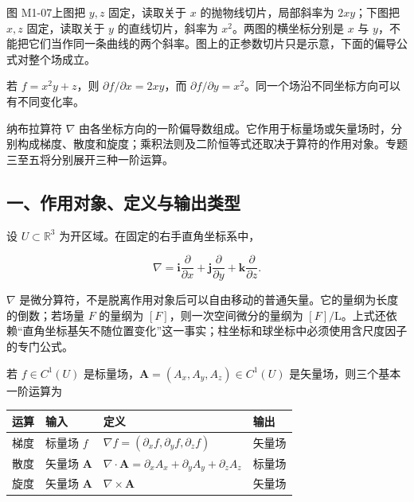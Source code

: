 图 M1-07上图把 \(y,z\) 固定，读取关于 \(x\) 的抛物线切片，局部斜率为
\(2xy\)；下图把 \(x,z\) 固定，读取关于 \(y\) 的直线切片，斜率为
\(x^2\)。两图的横坐标分别是 \(x\) 与
\(y\)，不能把它们当作同一条曲线的两个斜率。图上的正参数切片只是示意，下面的偏导公式对整个场成立。

若 \(f=x^2y+z\)，则 \(\partial f/\partial x=2xy\)，而
\(\partial f/\partial y=x^2\)。同一个场沿不同坐标方向可以有不同变化率。

纳布拉算符 \(\nabla\)
由各坐标方向的一阶偏导数组成。它作用于标量场或矢量场时，分别构成梯度、散度和旋度；乘积法则及二阶恒等式还取决于算符的作用对象。专题三至五将分别展开三种一阶运算。

\subsection{一、作用对象、定义与输出类型}\label{m1:ux4e00ux4f5cux7528ux5bf9ux8c61ux5b9aux4e49ux4e0eux8f93ux51faux7c7bux578b}

设 \(U\subset\mathbb R^3\) 为开区域。在固定的右手直角坐标系中，

\[
\boxed{\nabla
=\mathbf i\frac{\partial}{\partial x}
+\mathbf j\frac{\partial}{\partial y}
+\mathbf k\frac{\partial}{\partial z}}.
\]

\(\nabla\)
是微分算符，不是脱离作用对象后可以自由移动的普通矢量。它的量纲为长度的倒数；若场量
\(F\) 的量纲为 \([F]\)，则一次空间微分的量纲为
\([F]/\mathrm L\)。上式还依赖``直角坐标基矢不随位置变化''这一事实；柱坐标和球坐标中必须使用含尺度因子的专门公式。

若 \(f\in C^1(U)\) 是标量场，\(\mathbf A=(A_x,A_y,A_z)\in C^1(U)\)
是矢量场，则三个基本一阶运算为

{\def\LTcaptype{none} %
\begin{longtable}[]{@{}
  >{\raggedright\arraybackslash}p{}
  >{\raggedright\arraybackslash}p{}
  >{\raggedright\arraybackslash}p{}
  >{\raggedright\arraybackslash}p{}@{}}
\toprule\noalign{}
\begin{minipage}[b]{\linewidth}\raggedright
运算
\end{minipage} & \begin{minipage}[b]{\linewidth}\raggedright
输入
\end{minipage} & \begin{minipage}[b]{\linewidth}\raggedright
定义
\end{minipage} & \begin{minipage}[b]{\linewidth}\raggedright
输出
\end{minipage} \\
\midrule\noalign{}
\endhead
\bottomrule\noalign{}
\endlastfoot
梯度 & 标量场 \(f\) & \(\nabla f=(\partial_xf,\partial_yf,\partial_zf)\)
& 矢量场 \\
散度 & 矢量场 \(\mathbf A\) &
\(\nabla\cdot\mathbf A=\partial_xA_x+\partial_yA_y+\partial_zA_z\) &
标量场 \\
旋度 & 矢量场 \(\mathbf A\) & \(\nabla\times\mathbf A\) & 矢量场 \\
\end{longtable}
}

